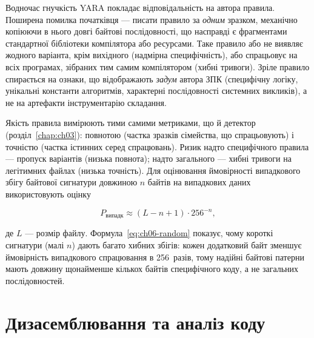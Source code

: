 Водночас гнучкість YARA покладає відповідальність на автора правила. Поширена помилка початківця --- писати правило за \emph{одним} зразком, механічно копіюючи в нього довгі байтові послідовності, що насправді є фрагментами стандартної бібліотеки компілятора або ресурсами. Таке правило або не виявляє жодного варіанта, крім вихідного (надмірна специфічність), або спрацьовує на всіх програмах, зібраних тим самим компілятором (хибні тривоги). Зріле правило спирається на ознаки, що відображають \emph{задум} автора ЗПК (специфічну логіку, унікальні константи алгоритмів, характерні послідовності системних викликів), а не на артефакти інструментарію складання.

Якість правила вимірюють тими самими метриками, що й детектор (розділ~\ref{chap:ch03}): повнотою (частка зразків сімейства, що спрацьовують) і точністю (частка істинних серед спрацювань). Ризик надто специфічного правила --- пропуск варіантів (низька повнота); надто загального --- хибні тривоги на легітимних файлах (низька точність). Для оцінювання ймовірності випадкового збігу байтової сигнатури довжиною $n$ байтів на випадкових даних використовують оцінку

\begin{equation}
P_{\text{випадк}} \approx (L - n + 1)\cdot 256^{-n},
\label{eq:ch06-random}
\end{equation}

де $L$ --- розмір файлу. Формула~\eqref{eq:ch06-random} показує, чому короткі сигнатури (малі $n$) дають багато хибних збігів: кожен додатковий байт зменшує ймовірність випадкового спрацювання в 256~разів, тому надійні байтові патерни мають довжину щонайменше кількох байтів специфічного коду, а не загальних послідовностей.

\section{Дизасемблювання та аналіз коду}\label{sec:ch06-disasm}

